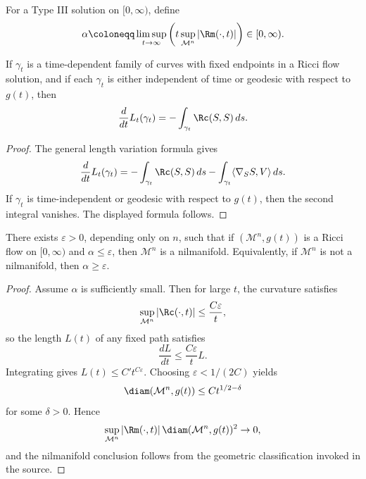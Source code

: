 \begin{definition}
\label{ch08-def-type-iii-limsup-scale}

For a Type III solution on \([0,\infty)\), define
\[
\alpha\coloneqq \limsup_{t\to\infty}\left(t\sup_{\mathcal M^n}|\Rm(\cdot,t)|\right)\in[0,\infty).
\]
\end{definition}

\begin{corollary}
\label{ch08-cor-length-under-ricci-flow}

If \(\gamma_t\) is a time-dependent family of curves with fixed endpoints in a Ricci flow solution, and if each \(\gamma_t\) is either independent of time or geodesic with respect to \(g(t)\), then
\[
\frac{d}{dt}L_t(\gamma_t)=-\int_{\gamma_t}\Rc(S,S)\,ds.
\]
\end{corollary}

\begin{proof}
\sketch The general length variation formula gives
\[
\frac{d}{dt}L_t(\gamma_t)
= -\int_{\gamma_t}\Rc(S,S)\,ds
- \int_{\gamma_t}\langle \nabla_S S,V\rangle\,ds.
\]
If \(\gamma_t\) is time-independent or geodesic with respect to \(g(t)\), then the second integral vanishes. The displayed formula follows.
\end{proof}

\begin{proposition}
\label{ch08-prop-type-iii-lower-bound}

There exists \(\varepsilon>0\), depending only on \(n\), such that if \((\mathcal M^n,g(t))\) is a Ricci flow on \([0,\infty)\) and \(\alpha\le\varepsilon\), then \(\mathcal M^n\) is a nilmanifold. Equivalently, if \(\mathcal M^n\) is not a nilmanifold, then \(\alpha\ge\varepsilon\).
\end{proposition}

\begin{proof}
\sketch Assume \(\alpha\) is sufficiently small. Then for large \(t\), the curvature satisfies
\[
\sup_{\mathcal M^n}|\Rc(\cdot,t)|\le \frac{C\varepsilon}{t},
\]
so the length \(L(t)\) of any fixed path satisfies
\[
\frac{dL}{dt}\le \frac{C\varepsilon}{t}L.
\]
Integrating gives \(L(t)\le C' t^{C\varepsilon}\). Choosing \(\varepsilon<1/(2C)\) yields
\[
\diam(\mathcal M^n,g(t))\le Ct^{1/2-\delta}
\]
for some \(\delta>0\). Hence
\[
\sup_{\mathcal M^n}|\Rm(\cdot,t)|\,\diam(\mathcal M^n,g(t))^2\to0,
\]
and the nilmanifold conclusion follows from the geometric classification invoked in the source.
\end{proof}

